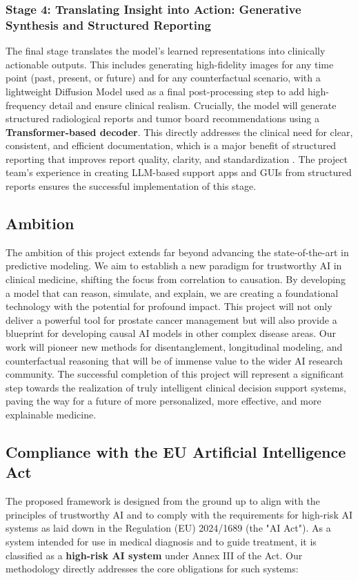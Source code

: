 \documentclass[11pt, a4paper]{article}
\begin{document}
\subsubsection{Stage 4: Translating Insight into Action: Generative Synthesis and Structured Reporting}
The final stage translates the model's learned representations into clinically actionable outputs. This includes generating high-fidelity images for any time point (past, present, or future) and for any counterfactual scenario, with a lightweight Diffusion Model used as a final post-processing step to add high-frequency detail and ensure clinical realism. Crucially, the model will generate structured radiological reports and tumor board recommendations using a \textbf{Transformer-based decoder}. This directly addresses the clinical need for clear, consistent, and efficient documentation, which is a major benefit of structured reporting that improves report quality, clarity, and standardization \cite{JorgHalfmann2023, SacoranskyKwan2024}. The project team's experience in creating LLM-based support apps and GUIs from structured reports ensures the successful implementation of this stage.

\subsection{Ambition}
The ambition of this project extends far beyond advancing the state-of-the-art in predictive modeling. We aim to establish a new paradigm for trustworthy AI in clinical medicine, shifting the focus from correlation to causation. By developing a model that can reason, simulate, and explain, we are creating a foundational technology with the potential for profound impact. This project will not only deliver a powerful tool for prostate cancer management but will also provide a blueprint for developing causal AI models in other complex disease areas. Our work will pioneer new methods for disentanglement, longitudinal modeling, and counterfactual reasoning that will be of immense value to the wider AI research community. The successful completion of this project will represent a significant step towards the realization of truly intelligent clinical decision support systems, paving the way for a future of more personalized, more effective, and more explainable medicine.

\subsection{Compliance with the EU Artificial Intelligence Act}
The proposed framework is designed from the ground up to align with the principles of trustworthy AI and to comply with the requirements for high-risk AI systems as laid down in the Regulation (EU) 2024/1689 (the "AI Act"). As a system intended for use in medical diagnosis and to guide treatment, it is classified as a \textbf{high-risk AI system} under Annex III of the Act. Our methodology directly addresses the core obligations for such systems:
\end{document}
